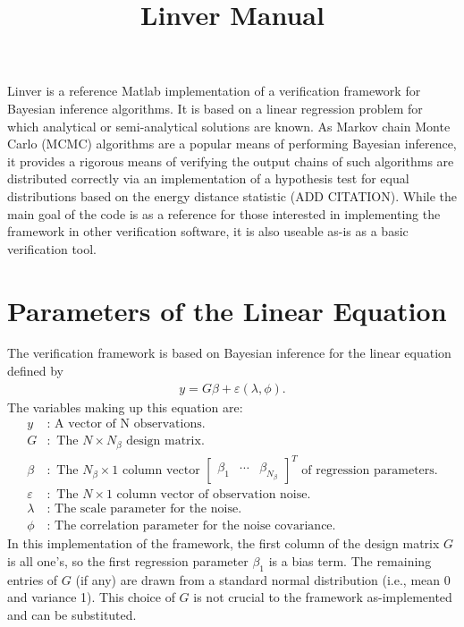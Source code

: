 \documentclass{book}
\title{Linver Manual}
\begin{document}
\maketitle

Linver is a reference Matlab implementation of a verification framework for Bayesian inference algorithms. It is
based on a linear regression problem for which analytical or semi-analytical solutions are known. As
Markov chain Monte Carlo (MCMC) algorithms are a popular means of performing Bayesian inference, 
it provides a rigorous means of verifying the output chains of such algorithms are distributed correctly
via an implementation of a hypothesis test for equal distributions based on the energy distance
statistic (ADD CITATION). While the main goal of the code is as a reference for those interested in 
implementing the framework in other verification software, it is also useable as-is as a basic verification
tool. 

\chapter{Parameters of the Linear Equation}
\label{chap:lineqn}
The verification framework is based on Bayesian inference for the linear equation defined by
\begin{align*}
y = G\beta + \varepsilon(\lambda, \phi).
\end{align*}
The variables making up this equation are:
\begin{align*}
y &: \text{ A vector of N observations.} \\
G &: \text{ The } N \times N_\beta \text{ design matrix.} \\
\beta &: \text{ The } N_\beta \times 1 \text{ column vector } 
	     \begin{bmatrix}\beta_1 & \cdots & \beta_{N_\beta}\end{bmatrix}^T 
	     \text{ of regression parameters.} \\
\varepsilon &: \text{ The } N \times 1 \text{ column vector of observation noise.} \\
\lambda &: \text{ The scale parameter for the noise.} \\
\phi &: \text{ The correlation parameter for the noise covariance.}
\end{align*}
In this implementation of the framework, the first column of the design matrix $G$ is all one's, so the first
regression parameter $\beta_1$ is a bias term. The remaining entries of $G$ (if any) are drawn from a
standard normal distribution (i.e., mean 0 and variance 1). This choice of $G$ is not crucial to the framework
as-implemented and can be substituted. 
\end{document}
